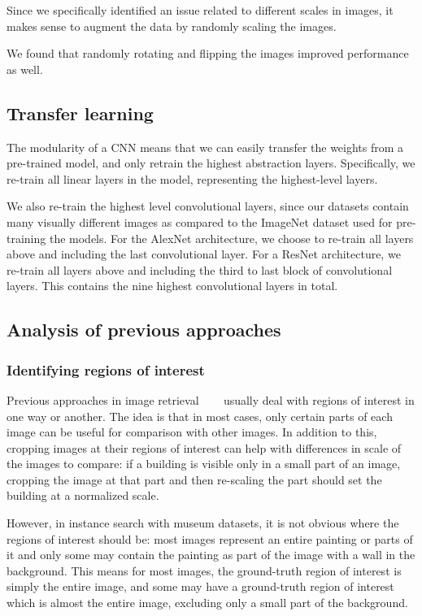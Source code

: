 Since we specifically identified an issue related to different scales
in images, it makes sense to augment the data by randomly scaling the
images. %

We found that randomly rotating and flipping the images improved performance
as well.

\subsection{Transfer learning}
The modularity of a CNN means that we can easily transfer
the weights from a pre-trained model, and only retrain the highest
abstraction layers. Specifically, we re-train all linear layers in the
model, representing the highest-level layers.

We also re-train the highest level convolutional layers, since our datasets
contain many visually different images as compared to the ImageNet
dataset used for pre-training the models.
For the AlexNet architecture, we choose to re-train all layers above
and including the last convolutional layer.
For a ResNet architecture, we re-train all layers above and including the
third to last block of convolutional layers. This contains the
nine highest convolutional layers in total.

\subsection{Analysis of previous approaches}\label{sec:analysisprev}
\subsubsection{Identifying regions of interest}
Previous approaches in image retrieval~\cite{gordo_end--end_2016}
~\cite{salvador_faster_2016}~\cite{tolias_particular_2015}
usually deal with regions of interest in one way or another.
The idea is that in most cases, only certain parts of each image can
be useful for comparison with other images. In addition to this,
cropping images at their regions of interest can help with differences
in scale of the images to compare: if a building is visible only in a small
part of an image, cropping the image at that part and then re-scaling
the part should set the building at a normalized scale.

However, in instance search with museum datasets, it is not obvious
where the regions of interest should be: most images represent an entire
painting or parts of it and only some may contain the painting as part
of the image with a wall in the background. This means for most images,
the ground-truth region of interest is simply the entire image, and some
may have a ground-truth region of interest which is almost the entire image,
excluding only a small part of the background.

